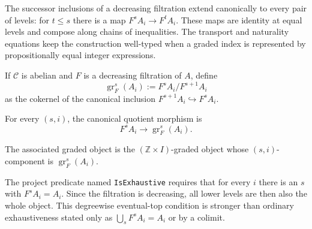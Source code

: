 \begin{definition}
  \leanok
  \label{def:core-filtration-inclusions}
  The successor inclusions of a decreasing filtration extend canonically to
  every pair of levels: for $t\le s$ there is a map
  $F^sA_i\to F^tA_i$.  These maps are identity at equal levels and compose
  along chains of inequalities.  The transport and naturality equations keep
  the construction well-typed when a graded index is represented by
  propositionally equal integer expressions.
\end{definition}

\begin{definition}
  \leanok
  \label{def:core-associated-graded}
  If $\mathcal C$ is abelian and $F$ is a decreasing filtration of $A$, define
  \[
    \operatorname{gr}^s_F(A_i) := F^sA_i/F^{s+1}A_i
  \]
  as the cokernel of the canonical inclusion
  $F^{s+1}A_i\hookrightarrow F^sA_i$.
\end{definition}

\begin{definition}
  \leanok
  \label{def:core-to-associated-graded}
  For every $(s,i)$, the canonical quotient morphism is
  \[
    F^sA_i\longrightarrow \operatorname{gr}^s_F(A_i).
  \]
\end{definition}

\begin{definition}
  \leanok
  \label{def:core-associated-graded-object}
  The associated graded object is the $(\mathbb Z\times I)$-graded object
  whose $(s,i)$-component is $\operatorname{gr}^s_F(A_i)$.
\end{definition}

\begin{definition}
  \leanok
  \label{def:core-exhaustive-filtration}
  The project predicate named \texttt{IsExhaustive} requires that for every
  $i$ there is an $s$ with $F^sA_i=A_i$.  Since the filtration is decreasing,
  all lower levels are then also the whole object.  This degreewise
  eventual-top condition is stronger than ordinary exhaustiveness stated only
  as $\bigcup_sF^sA_i=A_i$ or by a colimit.
\end{definition}

